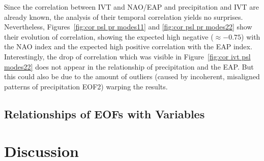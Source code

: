 Since the correlation between IVT and NAO/EAP and precipitation and IVT are already known, the analysis of their temporal correlation yields no surprises. 
Nevertheless, Figures~\ref{fig:cor psl pr modes11} and \ref{fig:cor psl pr modes22} show their evolution of correlation, showing the expected high negative ($\approx -0.75$) with the NAO index and the expected high positive correlation with the EAP index. 
Interestingly, the drop of correlation which was visible in Figure~\ref{fig:cor ivt psl modes22} does not appear in the relationship of precipitation and the EAP. 
But this could also be due to the amount of outliers (caused by incoherent, misaligned patterns of precipitation EOF2) warping the results. 




\subsection{Relationships of EOFs with Variables}


\section{Discussion}
\label{sec:discussion}
